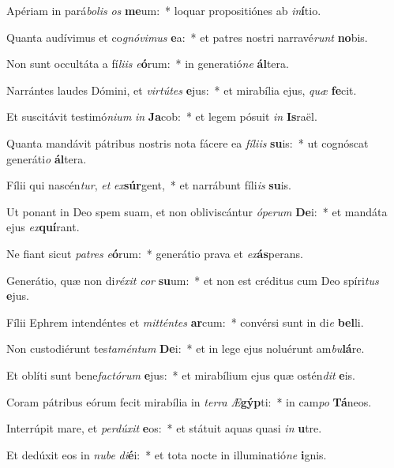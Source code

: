 \item Apériam in pará\textit{bo}\textit{lis} \textit{os} \textbf{me}um:~* loquar propositiónes ab \textit{in}\textbf{í}tio.
\item Quanta audívimus et co\textit{gnó}\textit{vi}\textit{mus} \textbf{e}a:~* et patres nostri narravé\textit{runt} \textbf{no}bis.
\item Non sunt occultáta a fí\textit{li}\textit{is} \textit{e}\textbf{ó}rum:~* in generatió\textit{ne} \textbf{ál}tera.
\item Narrántes laudes Dómini, et \textit{vir}\textit{tú}\textit{tes} \textbf{e}jus:~* et mirabília ejus, \textit{quæ} \textbf{fe}cit.
\item Et suscitávit testimó\textit{ni}\textit{um} \textit{in} \textbf{Ja}cob:~* et legem pósuit \textit{in} \textbf{Is}raël.
\item Quanta mandávit pátribus nostris nota fácere ea \textit{fí}\textit{li}\textit{is} \textbf{su}is:~* ut cognóscat generáti\textit{o} \textbf{ál}tera.
\item Fílii qui nascén\textit{tur}, \textit{et} \textit{ex}\textbf{súr}gent,~* et narrábunt fíli\textit{is} \textbf{su}is.
\item Ut ponant in Deo spem suam, et non obliviscántur \textit{ó}\textit{pe}\textit{rum} \textbf{De}i:~* et mandáta ejus \textit{ex}\textbf{quí}rant.
\item Ne fiant sicut \textit{pa}\textit{tres} \textit{e}\textbf{ó}rum:~* generátio prava et \textit{ex}\textbf{ás}perans.
\item Generátio, quæ non di\textit{ré}\textit{xit} \textit{cor} \textbf{su}um:~* et non est créditus cum Deo spíri\textit{tus} \textbf{e}jus.
\item Fílii Ephrem intendéntes et \textit{mit}\textit{tén}\textit{tes} \textbf{ar}cum:~* convérsi sunt in di\textit{e} \textbf{bel}li.
\item Non custodiérunt tes\textit{ta}\textit{mén}\textit{tum} \textbf{De}i:~* et in lege ejus noluérunt am\textit{bu}\textbf{lá}re.
\item Et oblíti sunt bene\textit{fac}\textit{tó}\textit{rum} \textbf{e}jus:~* et mirabílium ejus quæ ostén\textit{dit} \textbf{e}is.
\item Coram pátribus eórum fecit mirabília in \textit{ter}\textit{ra} \textit{Æ}\textbf{gýp}ti:~* in cam\textit{po} \textbf{Tá}neos.
\item Interrúpit mare, et \textit{per}\textit{dú}\textit{xit} \textbf{e}os:~* et státuit aquas quasi \textit{in} \textbf{u}tre.
\item Et dedúxit eos in \textit{nu}\textit{be} \textit{di}\textbf{é}i:~* et tota nocte in illuminatió\textit{ne} \textbf{i}gnis.
